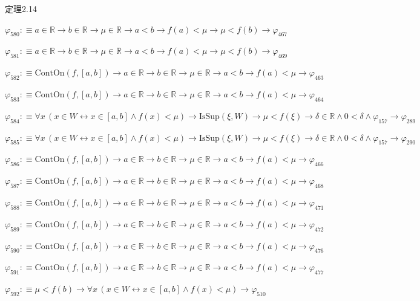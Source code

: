 \begin{fullproof}{定理2.14}
\begin{abbrevlist}
\item $\varphi_{580} :\equiv a \in \mathbb{R} \to b \in \mathbb{R} \to \mu \in \mathbb{R} \to a < b \to f(a) < \mu \to \mu < f(b) \to \varphi_{467}$
\item $\varphi_{581} :\equiv a \in \mathbb{R} \to b \in \mathbb{R} \to \mu \in \mathbb{R} \to a < b \to f(a) < \mu \to \mu < f(b) \to \varphi_{469}$
\item $\varphi_{582} :\equiv \mathrm{ContOn}(f,[a,b]) \to a \in \mathbb{R} \to b \in \mathbb{R} \to \mu \in \mathbb{R} \to a < b \to f(a) < \mu \to \varphi_{463}$
\item $\varphi_{583} :\equiv \mathrm{ContOn}(f,[a,b]) \to a \in \mathbb{R} \to b \in \mathbb{R} \to \mu \in \mathbb{R} \to a < b \to f(a) < \mu \to \varphi_{464}$
\item $\varphi_{584} :\equiv \forall x\,(x \in W \leftrightarrow x \in [a,b] \land f(x) < \mu) \to \mathrm{IsSup}(\xi,W) \to \mu < f(\xi) \to \delta \in \mathbb{R} \land 0 < \delta \land \varphi_{157} \to \varphi_{289}$
\item $\varphi_{585} :\equiv \forall x\,(x \in W \leftrightarrow x \in [a,b] \land f(x) < \mu) \to \mathrm{IsSup}(\xi,W) \to \mu < f(\xi) \to \delta \in \mathbb{R} \land 0 < \delta \land \varphi_{157} \to \varphi_{290}$
\item $\varphi_{586} :\equiv \mathrm{ContOn}(f,[a,b]) \to a \in \mathbb{R} \to b \in \mathbb{R} \to \mu \in \mathbb{R} \to a < b \to f(a) < \mu \to \varphi_{466}$
\item $\varphi_{587} :\equiv \mathrm{ContOn}(f,[a,b]) \to a \in \mathbb{R} \to b \in \mathbb{R} \to \mu \in \mathbb{R} \to a < b \to f(a) < \mu \to \varphi_{468}$
\item $\varphi_{588} :\equiv \mathrm{ContOn}(f,[a,b]) \to a \in \mathbb{R} \to b \in \mathbb{R} \to \mu \in \mathbb{R} \to a < b \to f(a) < \mu \to \varphi_{471}$
\item $\varphi_{589} :\equiv \mathrm{ContOn}(f,[a,b]) \to a \in \mathbb{R} \to b \in \mathbb{R} \to \mu \in \mathbb{R} \to a < b \to f(a) < \mu \to \varphi_{472}$
\item $\varphi_{590} :\equiv \mathrm{ContOn}(f,[a,b]) \to a \in \mathbb{R} \to b \in \mathbb{R} \to \mu \in \mathbb{R} \to a < b \to f(a) < \mu \to \varphi_{476}$
\item $\varphi_{591} :\equiv \mathrm{ContOn}(f,[a,b]) \to a \in \mathbb{R} \to b \in \mathbb{R} \to \mu \in \mathbb{R} \to a < b \to f(a) < \mu \to \varphi_{477}$
\item $\varphi_{592} :\equiv \mu < f(b) \to \forall x\,(x \in W \leftrightarrow x \in [a,b] \land f(x) < \mu) \to \varphi_{510}$

\end{abbrevlist}
\end{fullproof}
